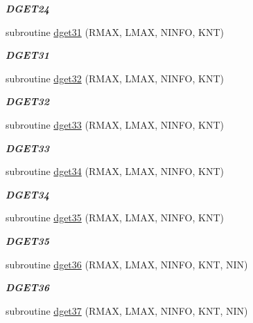 \begin{DoxyCompactItemize}
\begin{DoxyCompactList}\small\item\em {\bfseries D\+G\+E\+T24} \end{DoxyCompactList}\item 
subroutine \hyperlink{group__double__eig_gaec96be19f30761456f6973cfbfe302bb}{dget31} (R\+M\+A\+X, L\+M\+A\+X, N\+I\+N\+F\+O, K\+N\+T)
\begin{DoxyCompactList}\small\item\em {\bfseries D\+G\+E\+T31} \end{DoxyCompactList}\item 
subroutine \hyperlink{group__double__eig_gaa7bb9df80003ec4b42399fac9972fcdf}{dget32} (R\+M\+A\+X, L\+M\+A\+X, N\+I\+N\+F\+O, K\+N\+T)
\begin{DoxyCompactList}\small\item\em {\bfseries D\+G\+E\+T32} \end{DoxyCompactList}\item 
subroutine \hyperlink{group__double__eig_ga0d06279a44e3ee4af0c0122fc704857a}{dget33} (R\+M\+A\+X, L\+M\+A\+X, N\+I\+N\+F\+O, K\+N\+T)
\begin{DoxyCompactList}\small\item\em {\bfseries D\+G\+E\+T33} \end{DoxyCompactList}\item 
subroutine \hyperlink{group__double__eig_gac5920e80cf7499fc8cdb1c71f4e97ad3}{dget34} (R\+M\+A\+X, L\+M\+A\+X, N\+I\+N\+F\+O, K\+N\+T)
\begin{DoxyCompactList}\small\item\em {\bfseries D\+G\+E\+T34} \end{DoxyCompactList}\item 
subroutine \hyperlink{group__double__eig_gad85b2e71e578a368367a8c4043011129}{dget35} (R\+M\+A\+X, L\+M\+A\+X, N\+I\+N\+F\+O, K\+N\+T)
\begin{DoxyCompactList}\small\item\em {\bfseries D\+G\+E\+T35} \end{DoxyCompactList}\item 
subroutine \hyperlink{group__double__eig_gaca33e5cebfce251ead6098f633c8bc13}{dget36} (R\+M\+A\+X, L\+M\+A\+X, N\+I\+N\+F\+O, K\+N\+T, N\+I\+N)
\begin{DoxyCompactList}\small\item\em {\bfseries D\+G\+E\+T36} \end{DoxyCompactList}\item 
subroutine \hyperlink{group__double__eig_gabdcacf57969bb6f47213da97e24ca706}{dget37} (R\+M\+A\+X, L\+M\+A\+X, N\+I\+N\+F\+O, K\+N\+T, N\+I\+N)

\end{DoxyCompactItemize}
